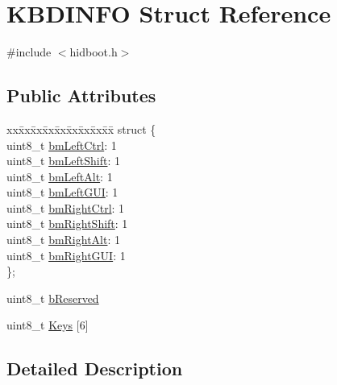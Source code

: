\hypertarget{struct_k_b_d_i_n_f_o}{\section{\-K\-B\-D\-I\-N\-F\-O \-Struct \-Reference}
\label{struct_k_b_d_i_n_f_o}
}


{\ttfamily \#include $<$hidboot.\-h$>$}

\subsection*{\-Public \-Attributes}
\begin{DoxyCompactItemize}
\item 
\begin{tabbing}
xx\=xx\=xx\=xx\=xx\=xx\=xx\=xx\=xx\=\kill
struct \{\\
\>uint8\_t \hyperlink{struct_k_b_d_i_n_f_o_a08fcf2c3356d92c48da5e0df455685a7}{bmLeftCtrl}: 1\\
\>uint8\_t \hyperlink{struct_k_b_d_i_n_f_o_a6e26029c5d90e5a31b1a289e40288480}{bmLeftShift}: 1\\
\>uint8\_t \hyperlink{struct_k_b_d_i_n_f_o_a7e0966433308d3ef40434a7352b4e6f1}{bmLeftAlt}: 1\\
\>uint8\_t \hyperlink{struct_k_b_d_i_n_f_o_a395dd36b5d26b2fa19eca4216710ea83}{bmLeftGUI}: 1\\
\>uint8\_t \hyperlink{struct_k_b_d_i_n_f_o_ab278c05888bbf6ba5536de6feab90ea8}{bmRightCtrl}: 1\\
\>uint8\_t \hyperlink{struct_k_b_d_i_n_f_o_acf82b510a3676bf60c122ad500c216c9}{bmRightShift}: 1\\
\>uint8\_t \hyperlink{struct_k_b_d_i_n_f_o_adcfb3f774c47e6654027ea3d65a0db78}{bmRightAlt}: 1\\
\>uint8\_t \hyperlink{struct_k_b_d_i_n_f_o_a516ec184b48c647eced74129f558fbc0}{bmRightGUI}: 1\\
\}; \\

\end{tabbing}\item 
uint8\-\_\-t \hyperlink{struct_k_b_d_i_n_f_o_a91061aae6b2f52c94b1ed734def585a0}{b\-Reserved}
\item 
uint8\-\_\-t \hyperlink{struct_k_b_d_i_n_f_o_a942e4eb5551fbe8958e858057391dd2d}{\-Keys} \mbox{[}6\mbox{]}
\end{DoxyCompactItemize}


\subsection{\-Detailed \-Description}


